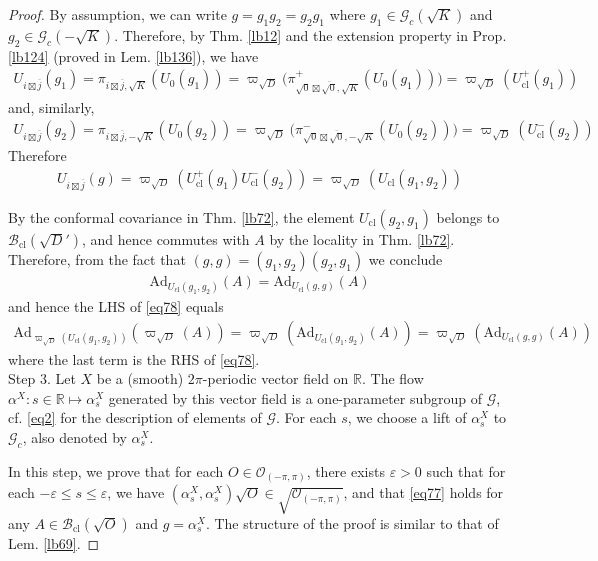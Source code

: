 \documentclass[11pt,b5paper,notitlepage]{article}
\theoremstyle{definition}
\theoremstyle{plain}
\newcommand{\ovl}{\overline}
\newcommand{\Ad}{\mathrm{Ad}}
\newcommand{\Rbb}{\mathbb R}
\newcommand{\Gc}{\mathscr G_c}
\newcommand{\eps}{\varepsilon}
\newcommand{\SG}{\mathscr G}
\newcommand{\sqz}{{\sqrt 0}}
\newcommand{\Bcl}{\mathcal B_{\mathrm{cl}}}
\newcommand{\Opp}{\mathcal O_{(-\pi,\pi)}}
\newcommand{\ZOpp}{\sqrt{\mathcal O_{(-\pi,\pi)}}}
\newcommand{\Ucl}{U_{\mathrm{cl}}}
\numberwithin{equation}{section}
\begin{document}
\begin{proof}
By assumption, we can write $g=g_1g_2=g_2g_1$ where $g_1\in\Gc(\sqrt K)$ and $g_2\in\Gc(-\sqrt K)$. Therefore, by Thm. \ref{lb12} and the extension property in Prop. \ref{lb124} (proved in Lem. \ref{lb136}), we have
\begin{align*}
U_{i\boxtimes\ovl j}(g_1)=\pi_{i\boxtimes\ovl j,\sqrt K}(U_0(g_1))=\varpi_{\sqrt D}\big(\pi^+_{\sqz\boxtimes\ovl\sqz,\sqrt K}(U_0(g_1))\big)=\varpi_{\sqrt D}(\Ucl^+(g_1))
\end{align*} 
and, similarly,
\begin{align*}
 U_{i\boxtimes\ovl j}(g_2)=\pi_{i\boxtimes\ovl j,-\sqrt K}(U_0(g_2))=\varpi_{\sqrt D}\big(\pi^-_{\sqz\boxtimes\ovl\sqz,-\sqrt K}(U_0(g_2))\big)=\varpi_{\sqrt D}(\Ucl^-(g_2))
\end{align*}
Therefore
\begin{align*}
U_{i\boxtimes\ovl j}(g)=\varpi_{\sqrt D}(\Ucl^+(g_1)\Ucl^-(g_2))=\varpi_{\sqrt D}(\Ucl(g_1,g_2))
\end{align*}

By the conformal covariance in Thm. \ref{lb72}, the element $\Ucl(g_2,g_1)$ belongs to $\Bcl(\sqrt D')$, and hence commutes with $A$ by the locality in Thm. \ref{lb72}. Therefore, from the fact that $(g,g)=(g_1,g_2)(g_2,g_1)$ we conclude
\begin{align*}
\Ad_{\Ucl(g_1,g_2)}(A)=\Ad_{\Ucl(g,g)}(A)
\end{align*}
and hence the LHS of \eqref{eq78} equals
\begin{align*}
\Ad_{\varpi_{\sqrt D}(\Ucl(g_1,g_2))}(\varpi_{\sqrt D}(A))=\varpi_{\sqrt D}(\Ad_{\Ucl(g_1,g_2)}(A))=\varpi_{\sqrt D}(\Ad_{\Ucl(g,g)}(A))
\end{align*}
where the last term is the RHS of \eqref{eq78}.\\[-1ex]


Step 3. Let $X$ be a (smooth) $2\pi$-periodic vector field on $\Rbb$. The flow $\alpha^X:s\in\Rbb\mapsto\alpha^X_s$ generated by this vector field is a one-parameter subgroup of $\SG$, cf. \eqref{eq2} for the description of elements of $\SG$. For each $s$, we choose a lift of $\alpha^X_s$ to $\Gc$, also denoted by $\alpha^X_s$. 


In this step, we prove that for each $O\in\Opp$, there exists $\eps>0$ such that for each $-\eps\leq s\leq\eps$, we have $(\alpha^X_s,\alpha^X_s)\sqrt O\in\ZOpp$, and that \eqref{eq77} holds for any $A\in\Bcl(\sqrt O)$ and $g=\alpha^X_s$. The structure of the proof is similar to that of Lem. \ref{lb69}.


\end{proof}
\end{document}
